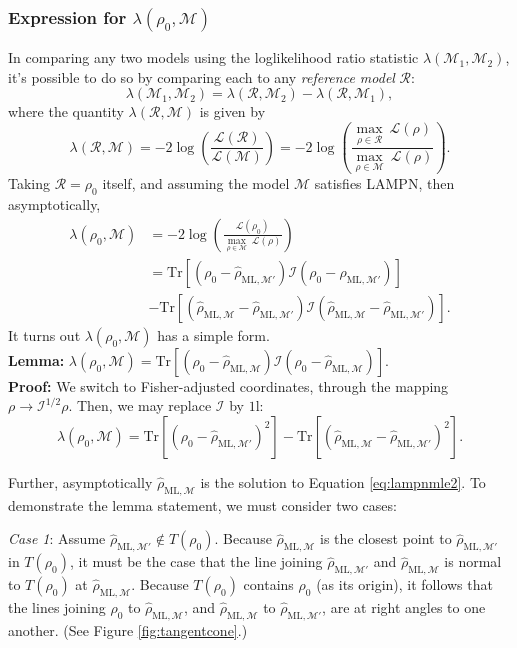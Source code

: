 \documentclass[aps,pra, twocolumn]{revtex4-1}
\newcommand{\M}{\mathcal{M}}
\newcommand{\cL}{\mathcal{L}}
\newcommand{\Id}{\mathbb{I}}
\def\Id{1\!\mathrm{l}}
\newcommand{\rhohat}{\hat{\rho}}
\newcommand{\rhoML}[1]{\rhohat_{\scriptscriptstyle{\mathrm{ML},#1}}}
\begin{document}
\subsubsection{Expression for $\lambda(\rho_{0}, \M)$}

In comparing any two models using the loglikelihood ratio statistic $\lambda(\M_{1}, \M_{2})$, it's possible to do so by comparing each to any \emph{reference model} $\mathcal{R}$: 
\[\lambda(\M_{1}, \M_{2}) = \lambda(\mathcal{R},\M_{2}) - \lambda(\mathcal{R},\M_{1}),\]
where the quantity $\lambda(\mathcal{R}, \M)$ is given by
\[\lambda(\mathcal{R}, \M) = -2 \log \left(\frac{\cL(\mathcal{R})}{\cL(\M)}\right) =  -2 \log \left(\frac{\underset{\rho \in \mathcal{R}}{\max}~\cL(\rho)}{\underset{\rho \in \M}{\max}~\cL(\rho)}\right).\]
Taking $\mathcal{R} = \rho_{0}$ itself, and assuming the model $\M$ satisfies LAMPN, then asymptotically,
\begin{align}
\label{eq:lambdalan}
\nonumber \lambda(\rho_{0}, \M)&= -2 \log \left(\frac{\cL(\rho_{0})}{\underset{\rho \in \M}{\max}~\cL(\rho)}\right)\\
\nonumber &= \mathrm{Tr}[(\rho_{0} - \rhoML{\M'})\mathcal{I}(\rho_{0} - \rhoML{\M'})]\\
&-  \mathrm{Tr}[(\rhoML{\M} - \rhoML{\M'})\mathcal{I}(\rhoML{\M} - \rhoML{\M'})].
\end{align}
It turns out $\lambda(\rho_{0}, \M)$ has a simple form.
~\\
\textbf{Lemma:} $\lambda(\rho_{0}, \M) = \mathrm{Tr}[(\rho_{0} - \rhoML{\M})\mathcal{I}(\rho_{0} - \rhoML{\M})]$.
~\\
\textbf{Proof:}
We switch to Fisher-adjusted coordinates, through the mapping $\rho \rightarrow \mathcal{I}^{1/2}\rho$. Then, we may replace $\mathcal{I}$ by $\Id$:
\begin{equation}
\label{eq:lambdalan2}
\lambda(\rho_{0}, \M) = \mathrm{Tr}[(\rho_{0} - \rhoML{\M'})^{2}]-  \mathrm{Tr}[(\rhoML{\M} - \rhoML{\M'})^{2}].
\end{equation}

Further, asymptotically $\rhoML{\M}$ is the solution to Equation \eqref{eq:lampnmle2}. To demonstrate the lemma statement, we must consider two cases:

\emph{Case 1}: Assume $\rhoML{\M'} \not \in T(\rho_{0})$. Because $\rhoML{\M}$ is the closest point to $\rhoML{\M'}$ in $T(\rho_{0})$, it must be the case that the line joining $\rhoML{\M'}$ and $\rhoML{\M}$ is normal to $T(\rho_{0})$ at $\rhoML{\M}$. Because $T(\rho_{0})$ contains $\rho_{0}$ (as its origin), it follows that the lines joining $\rho_{0}$ to $\rhoML{\M}$, and $\rhoML{\M}$ to $\rhoML{\M'}$, are at right angles to one another. (See Figure \ref{fig:tangentcone}.)
\end{document}
